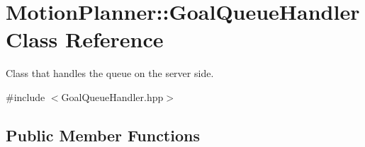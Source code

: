 \hypertarget{classMotionPlanner_1_1GoalQueueHandler}{}\section{Motion\+Planner\+:\+:Goal\+Queue\+Handler Class Reference}
\label{classMotionPlanner_1_1GoalQueueHandler}


Class that handles the queue on the server side.  




{\ttfamily \#include $<$Goal\+Queue\+Handler.\+hpp$>$}

\subsection*{Public Member Functions}

